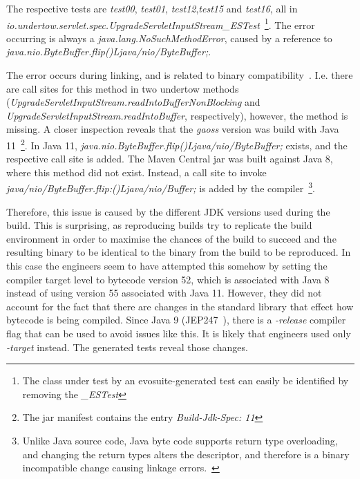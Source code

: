 \documentclass[conference]{IEEEtran}
\begin{document}
The respective tests are \textit{test00}, \textit{test01}, \textit{test12},\textit{test15} and \textit{test16}, all in \textit{io.under\-tow.\-servlet.\-spec.UpgradeServletInputStream\_ESTest}~\footnote{The class under test by an evosuite-generated test can easily be identified by removing the \textit{\_ESTest}}. The error occurring is always a \textit{java.lang.NoSuchMethodError}, caused by a reference to \textit{java.nio.ByteBuffer.flip()Ljava/nio/ByteBuffer;}.

The error occurs during linking, and is related to binary compatibility~\cite{JVM17Spec}. I.e. there are call sites for this method in two undertow methods (\textit{UpgradeServletInputStream.readIntoBufferNonBlocking} and \textit{UpgradeServletInputStream.readIntoBuffer}, respectively), however, the method is missing. 
A closer inspection reveals that the \textit{gaoss} version was build with Java 11~\footnote{The jar manifest contains the entry \textit{Build-Jdk-Spec: 11}}. In Java 11, \textit{java.nio.ByteBuffer.flip()Ljava/nio/ByteBuffer;} exists, and the respective call site is added. The Maven Central jar was built against Java 8, where this method did not exist.  Instead, a call site to invoke \textit{java/nio/ByteBuffer.flip:()Ljava/nio/Buffer;} is added by the compiler~\footnote{Unlike Java source code, Java byte code supports return type overloading, and changing the return types alters the descriptor, and therefore is a binary incompatible change causing linkage errors.~\cite{JVM17Spec,dietrich2014broken}}.

Therefore, this issue is caused by the different JDK versions used during the build. This is surprising, as reproducing builds try to replicate the build environment in order to maximise the chances of the build to succeed and the resulting binary to be identical to the binary from the build to be reproduced. In this case the engineers seem to have attempted this somehow by setting the compiler target level to bytecode version 52, which is associated with Java 8~\cite[Sect. 4.1]{JVM17Spec} instead of using version 55 associated with Java 11.  However, they did not account for the fact that there are changes in the standard library that effect how bytecode is being compiled. Since Java 9 (JEP247~\cite{jep247}), there is a \textit{-release} compiler  flag that can be used to avoid issues like this. It is likely that engineers used only \textit{-target} instead. The generated tests reveal those changes.  
\end{document}

